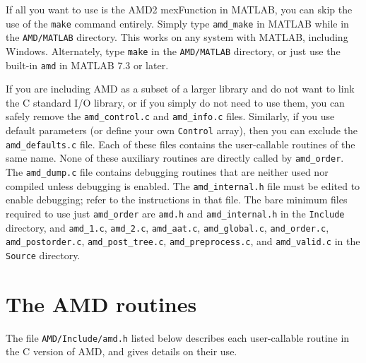 \documentclass[11pt]{article}
\begin{document}
If all you want to use is the AMD2 mexFunction in MATLAB, you can skip
the use of the {\tt make} command entirely.  Simply type
{\tt amd\_make} in MATLAB while in the {\tt AMD/MATLAB} directory.
This works on any system with MATLAB, including Windows.
Alternately, type {\tt make} in the {\tt AMD/MATLAB} directory,
or just use the built-in {\tt amd} in MATLAB 7.3 or later.

If you are including AMD as a subset of a larger library and do not want
to link the C standard I/O library, or if you simply do not need to use
them, you can safely remove the {\tt amd\_control.c} and {\tt amd\_info.c}
files.  Similarly, if you use default parameters (or define your
own {\tt Control} array), then you can exclude the {\tt amd\_defaults.c}
file.
Each of these files contains the user-callable routines of the same
name.  None of these auxiliary routines are directly called by
{\tt amd\_order}.
The {\tt amd\_dump.c} file contains debugging routines
that are neither used nor compiled unless debugging is enabled.
The {\tt amd\_internal.h} file must be edited to enable debugging;
refer to the instructions in that file.
The bare minimum files required to use just {\tt amd\_order} are
{\tt amd.h} and {\tt amd\_internal.h}
in the {\tt Include} directory,
and
{\tt amd\_1.c},
{\tt amd\_2.c},
{\tt amd\_aat.c},
{\tt amd\_global.c},
{\tt and\_order.c},
{\tt amd\_postorder.c},
{\tt amd\_post\_tree.c},
{\tt amd\_preprocess.c},
and
{\tt amd\_valid.c}
in the {\tt Source} directory.

\newpage
\section{The AMD routines}
\label{Primary}

The file {\tt AMD/Include/amd.h} listed below
describes each user-callable routine in the C version of AMD,
and gives details on their use.

{\footnotesize

}


\newpage



\end{document}
